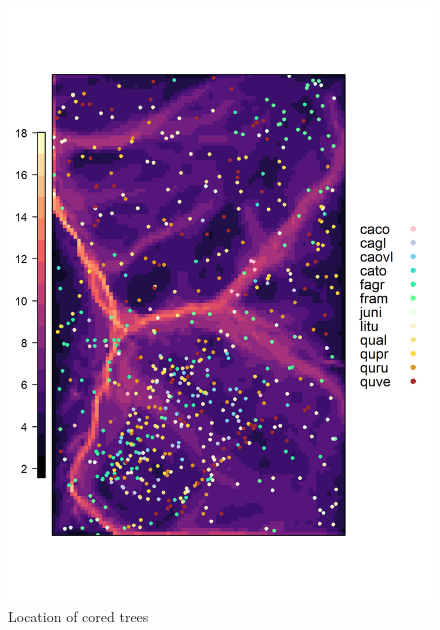 \documentclass[]{article}
\begin{document}
\begin{figure}
\centering
\includegraphics[width=5.20833in,height=\textheight]{tables_figures/FigureS3.png}
\caption{Location of cored trees}
\end{figure}
\end{document}
